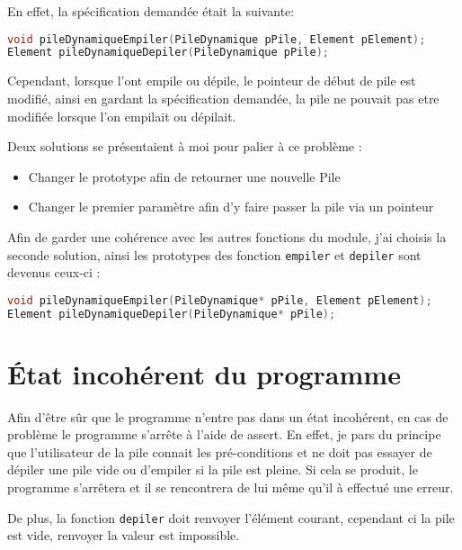 \documentclass[a4paper, 11pt]{article}
\begin{document}
	En effet, la spécification demandée était la suivante:
\begin{lstlisting}[language=C, numbers=none]
void pileDynamiqueEmpiler(PileDynamique pPile, Element pElement);
Element pileDynamiqueDepiler(PileDynamique pPile);
\end{lstlisting}

	Cependant, lorsque l'ont empile ou dépile, le pointeur de début de pile est modifié, ainsi en gardant la spécification demandée, la pile ne pouvait pas etre
	modifiée lorsque l'on empilait ou dépilait.

	Deux solutions se présentaient à moi pour palier à ce problème :
	\begin{itemize}
		\item Changer le prototype afin de retourner une nouvelle Pile
		\item Changer le premier paramètre afin d'y faire passer la pile via un pointeur
	\end{itemize}

	Afin de garder une cohérence avec les autres fonctions du module, j'ai choisis la seconde solution, ainsi les prototypes des fonction \texttt{empiler} et
	\texttt{depiler} sont devenus ceux-ci : 
\begin{lstlisting}[language=C, numbers=none]
void pileDynamiqueEmpiler(PileDynamique* pPile, Element pElement);
Element pileDynamiqueDepiler(PileDynamique* pPile);
\end{lstlisting}
\section{État incohérent du programme}
	Afin d'être sûr que le programme n'entre pas dans un état incohérent, en cas de problème le programme s'arrête à l'aide de assert. En effet, je pars du
	principe que l'utilisateur de la pile connait les pré-conditions et ne doit pas essayer de dépiler une pile vide ou d'empiler si la pile est pleine. 
	Si cela se produit, le programme s'arrêtera et il se rencontrera de lui même qu'il à effectué une erreur.

	De plus, la fonction \texttt{depiler} doit renvoyer l'élément courant, cependant ci la pile est vide, renvoyer la valeur est impossible.
\end{document}
